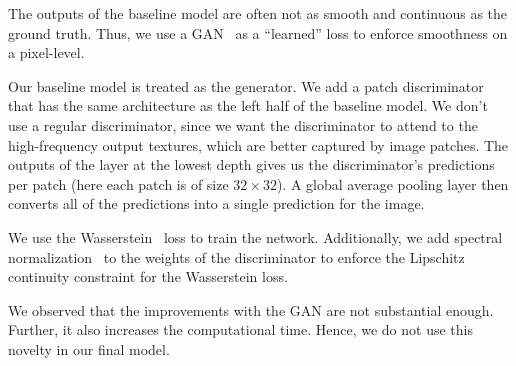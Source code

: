 The outputs of the baseline model are often not as smooth and continuous as the ground truth.
Thus, we use a GAN~\cite{gan} as a ``learned'' loss to enforce smoothness on a pixel-level.

Our baseline model is treated as the generator.
We add a patch discriminator~\cite{pix2pix} that has the same architecture as the left half of the baseline model.
We don't use a regular discriminator, since we want the discriminator to attend to the high-frequency output textures, which are better captured by image patches.
The outputs of the layer at the lowest depth gives us the discriminator's predictions per patch (here each patch is of size $32 \times 32$).
A global average pooling layer then converts all of the predictions into a single prediction for the image.

We use the Wasserstein~\cite{wgan} loss to train the network.
Additionally, we add spectral normalization~\cite{spectral-norm} to the weights of the discriminator to enforce the Lipschitz continuity constraint for the Wasserstein loss.

We observed that the improvements with the GAN are not substantial enough.
Further, it also increases the computational time.
Hence, we do not use this novelty in our final model.
